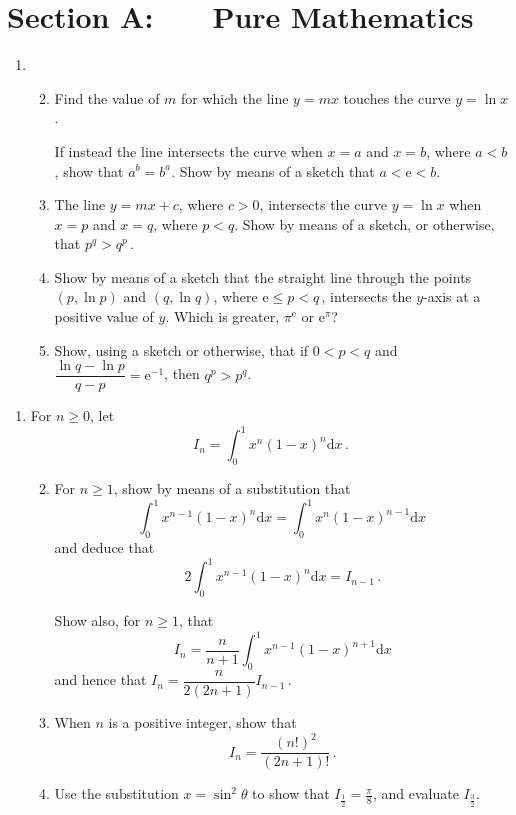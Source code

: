 \documentclass[a4, 11pt]{report}
\newlength{\qspace}
\newcounter{qnumber}
\newenvironment{question}%
 {\vspace{\qspace}
  \begin{enumerate}[\bfseries 1\quad][10]%
    \setcounter{enumi}{\value{qnumber}}%
    \item%
 }
{
  \end{enumerate}
  \filbreak
  \stepcounter{qnumber}
 }
\newenvironment{questionparts}[1][1]%
 {
  \begin{enumerate}[\bfseries (i)]%
    \setcounter{enumii}{#1}
    \addtocounter{enumii}{-1}
    \setlength{\itemsep}{5mm}
    \setlength{\parskip}{8pt}
 }
 {
  \end{enumerate}
 }
\def\d{{\mathrm d}}
\def\e{{\mathrm e}}
\def\le{\leqslant}
\def\ge{\geqslant}
\begin{document}
\setcounter{page}{2}

 
\section*{Section A: \ \ \ Pure Mathematics}

\begin{question}
\begin{questionparts}
\item Find the value of $m$ for which  the line 
$y = mx$ touches  the curve $y = \ln x\,$.  

If instead the line intersects the curve
when $x = a$ and $x = b$, where $a < b$, show  that $a^b = b^a$. 
Show by means of a sketch  that $a < \e < b$.

\item  
The line $y=mx+c$, where $c>0$,
 intersects the curve $y=\ln x$ when $x=p$ and $x=q$,
where $p<q$.
Show by means of a sketch, or otherwise,  that $p^q>q^p\,$.

\item
Show by means of a sketch that the
 straight line through the points
$(p, \ln p)$ and $(q, \ln q)$, where $\e\le p<q\,$,  intersects  the $y$-axis
at a positive value of $y$.  Which is greater, $\pi^\e$ or $\e^\pi$?

\item
Show, using a sketch or otherwise, that if $0<p<q$ and 
 $\dfrac{\ln q - \ln p}{q-p} = \e^{-1}$, then $q^p>p^q$.  
 
\end{questionparts}
\end{question}
\vspace{-0.8cm}
\begin{question}
For $n\ge 0$, let 
\[
I_n = \int_0^1 x^n(1-x)^n\d x\,.
\]

\begin{questionparts}
\item
For $n\ge 1$, show by means of a substitution that 
\[
 \int_0^1 x^{n-1}(1-x)^n\d x = \int_0^1 x^n(1-x)^{n-1}\d x\,
\]
and deduce that 
\[
2
 \int_0^1 x^{n-1}(1-x)^n\d x = I_{n-1}\,.
\]

Show also, for $n\ge1$, that
\[
I_n = \frac n {n+1} \int_0^1 x^{n-1} (1-x)^{n+1} \d x
\]
and hence that $I_n = \dfrac{n}{2(2n+1)} I_{n-1}\,.$


\item When $n$ is a
 positive integer, show that
\[
I_n = \frac{(n!)^2}{(2n+1)!}\,.
\]

\item
Use the substitution $x= \sin^2 \theta$ to show
that $I_{\frac12}= \frac \pi 8$, and evaluate $I_{\frac32}$.
\end{questionparts}
\end{question}
\end{document}
